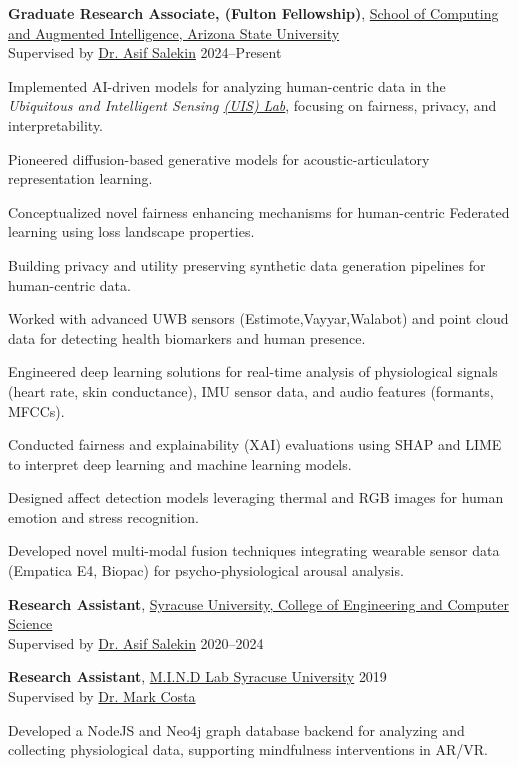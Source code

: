 \documentclass[a4paper,11pt]{article}
\begin{document}
\textbf{Graduate Research Associate, (Fulton Fellowship)},
\href{https://scai.engineering.asu.edu/}{
School of Computing and Augmented Intelligence, Arizona State University}\\
Supervised by \href{https://asalekin.github.io/}{Dr. Asif Salekin}
\hfill {2024--Present}
\begin{innerlist}
    \item Implemented AI-driven models for analyzing human-centric data in the \textit{Ubiquitous and Intelligent Sensing \href{https://uislab.github.io/}{(UIS) Lab}}, focusing on fairness, privacy, and interpretability.
    \item Pioneered diffusion-based generative models for acoustic-articulatory representation learning.
    \item Conceptualized novel fairness enhancing mechanisms for human-centric Federated learning using loss landscape properties.
    \item Building privacy and utility preserving synthetic data generation pipelines for human-centric data. 
    \item Worked with advanced UWB sensors (Estimote,Vayyar,Walabot) and point cloud data for detecting health biomarkers and human presence.
    \item Engineered deep learning solutions for real-time analysis of physiological signals (heart rate, skin conductance), IMU sensor data, and audio features (formants, MFCCs).
    \item Conducted fairness and explainability (XAI) evaluations using SHAP and LIME to interpret deep learning and machine learning models.
    \item Designed affect detection models leveraging thermal and RGB images for human emotion and stress recognition.
    \item Developed novel multi-modal fusion techniques integrating wearable sensor data (Empatica E4, Biopac) for psycho-physiological arousal analysis.
\end{innerlist}

\textbf{Research Assistant},
\href{https://ecs.syracuse.edu/}{Syracuse University, College of Engineering and Computer Science}\\
Supervised by \href{https://asalekin.github.io/}{Dr. Asif Salekin}
\hfill {2020--2024}

\vspace{0.1cm}

\textbf{Research Assistant},
\href{http://www.mind-labs.org/}{M.I.N.D Lab Syracuse University} 
\hfill {2019}\\
Supervised by \href{http://www.mind-labs.org/people/2017/2/24/mark-r-costa-1}{Dr. Mark Costa}
\begin{innerlist}
\item  Developed a NodeJS and Neo4j graph database backend for analyzing and collecting physiological data, supporting mindfulness interventions in AR/VR. 
\end{innerlist}
\end{document}
